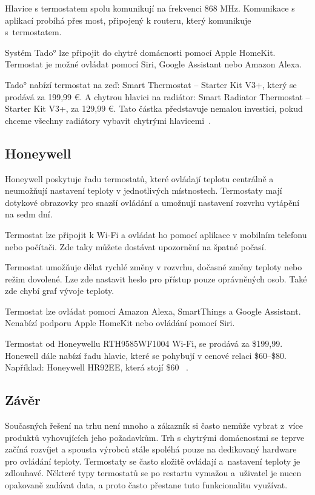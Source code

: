 \documentclass[thesis=B,czech]{FITthesis}[2012/10/20]
\begin{document}
Hlavice s termostatem spolu komunikují na frekvenci 868 MHz. Komunikace s aplikací probíhá přes most, připojený k routeru, který komunikuje s~termostatem.

Systém Tado° lze připojit do chytré domácnosti pomocí Apple HomeKit. Termostat je možné ovládat pomocí Siri, Google Assistant nebo Amazon Alexa.

Tado° nabízí termostat na zeď: Smart Thermostat -- Starter Kit V3+, který se prodává za 199,99 €. A chytrou hlavici na radiátor: Smart Radiator Thermostat -- Starter Kit V3+, za 129,99 €. Tato částka představuje nemalou investici, pokud chceme všechny radiátory vybavit chytrými hlavicemi~\cite{tado}.

\subsection{Honeywell}

Honeywell poskytuje řadu termostatů, které ovládají teplotu centrálně a neumožňují nastavení teploty v jednotlivých místnostech. Termostaty mají dotykové obrazovky pro snazší ovládání a umožnují nastavení rozvrhu vytápění na sedm dní.

Termostat lze připojit k Wi-Fi a ovládat ho pomocí aplikace v mobilním telefonu nebo počítači. Zde taky můžete dostávat upozornění na špatné počasí.

Termostat umožňuje dělat rychlé změny v rozvrhu, dočasné změny teploty nebo režim dovolené. Lze zde nastavit heslo pro přístup pouze oprávněných osob.
Také zde chybí graf vývoje teploty.

Termostat lze ovládat pomocí Amazon Alexa, SmartThings a Google Assistant. Nenabízí podporu Apple HomeKit nebo ovládání pomocí Siri.

Termostat od Honeywellu RTH9585WF1004 Wi-Fi, se prodává za \$199,99. Honewell dále nabízí řadu hlavic, které se pohybují v cenové relaci \$60--\$80. Například: Honeywell HR92EE, která stojí \$60 ~\cite{honey}.

\subsection{Závěr}

Současných řešení na trhu není mnoho a zákazník si často nemůže vybrat z~více produktů vyhovujících jeho požadavkům. Trh s chytrými domácnostmi se teprve začíná rozvíjet a spousta výrobců stále spoléhá pouze na dedikovaný hardware pro ovládání teploty. Termostaty se často složitě ovládají a~nastavení teploty je zdlouhavé. Některé typy termostatů se po restartu vymažou a~uživatel je nucen opakovaně zadávat data, a proto často přestane tuto funkcionalitu využívat.
\end{document}
